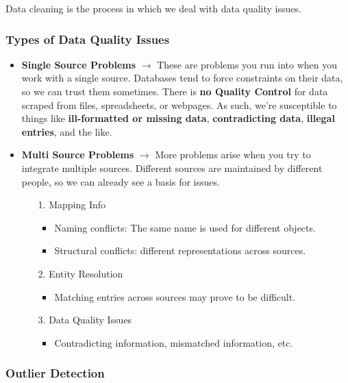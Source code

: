 \documentclass[english, 10pt]{article}
\begin{document}
Data cleaning is the process in which we deal with data quality issues.\\

\subsubsection{Types of Data Quality Issues}

\begin{itemize}
	\item \textbf{Single Source Problems} $\rightarrow$ These are problems you run into when you work with a single source. Databases tend to force constraints on their data, so we can trust them sometimes. There is \textbf{no Quality Control} for data scraped from files, spreadsheets, or webpages. As such, we're susceptible to things like \textbf{ill-formatted or missing data}, \textbf{contradicting data}, \textbf{illegal entries}, and the like.
	\item \textbf{Multi Source Problems} $\rightarrow$ More problems arise when you try to integrate multiple sources. Different sources are maintained by different people, so we can already see a basis for issues.
	\begin{itemize}
		\item[1.] Mapping Info
		\begin{itemize}
			\item Naming conflicts: The same name is used for different objects.
			\item Structural conflicts: different representations across sources.
		\end{itemize}
		\item[2.] Entity Resolution
		\begin{itemize}
			\item Matching entries across sources may prove to be difficult.
		\end{itemize}
		\item[3.] Data Quality Issues
		\begin{itemize}
			\item Contradicting information, mismatched information, etc.
		\end{itemize}
	\end{itemize}
\end{itemize}

\subsubsection{Outlier Detection}
\end{document}
